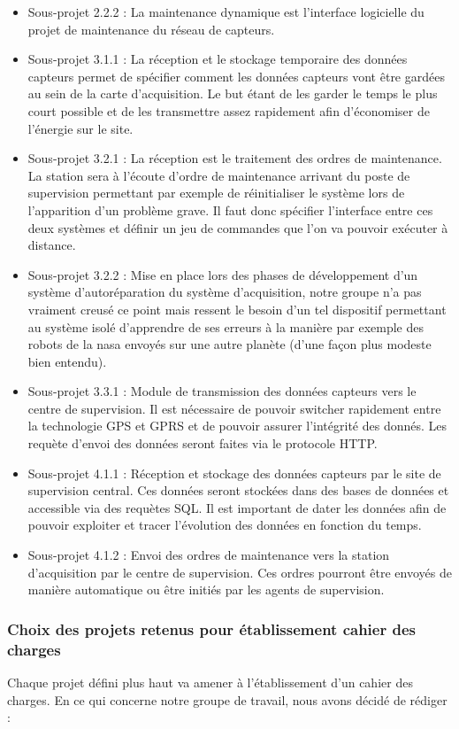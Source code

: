 \begin{itemize}
\item Sous-projet 2.2.2 : La maintenance dynamique est l'interface logicielle du projet de maintenance du réseau de capteurs.
\medskip
\item Sous-projet 3.1.1 : La réception et le stockage temporaire des données capteurs permet de spécifier comment les données capteurs vont être gardées au sein de la carte d'acquisition. Le but étant de les garder le temps le plus court possible et de les transmettre assez rapidement afin d'économiser de l'énergie sur le site.
\item Sous-projet 3.2.1 : La réception est le traitement des ordres de maintenance. La station sera à l'écoute d'ordre de maintenance arrivant du poste de supervision permettant par exemple de réinitialiser le système lors de l'apparition d'un problème grave. Il faut donc spécifier l'interface entre ces deux systèmes et définir un jeu de commandes que l'on va pouvoir exécuter à distance.
\item Sous-projet 3.2.2 : Mise en place lors des phases de développement d'un système d'\og autoréparation du système d'acquisition, notre groupe n'a pas vraiment creusé ce point mais ressent le besoin d'un tel dispositif permettant au système isolé d'apprendre de ses erreurs à la manière par exemple des robots de la nasa envoyés sur une autre planète (d'une façon plus modeste bien entendu).
\item Sous-projet 3.3.1 : Module de transmission des données capteurs vers le centre de supervision. Il est nécessaire de pouvoir switcher rapidement entre la technologie GPS et GPRS et de pouvoir assurer l'intégrité des donnés. Les requète d'envoi des données seront faites via le protocole HTTP.
\meskip 
\item Sous-projet 4.1.1 : Réception et stockage des données capteurs par le site de supervision central. Ces données seront stockées dans des bases de données et accessible via des requètes SQL. Il est important de dater les données afin de pouvoir exploiter et tracer l'évolution des données en fonction du temps.
\item Sous-projet 4.1.2 : Envoi des ordres de maintenance vers la station d'acquisition par le centre de supervision. Ces ordres pourront être envoyés de manière automatique ou être initiés par les agents de supervision.
\end{itemize}


\subsubsection{Choix des projets retenus pour établissement cahier des charges}
Chaque projet défini plus haut va amener à l'établissement d'un cahier des charges. En ce qui concerne notre groupe de travail, nous avons décidé de rédiger :

